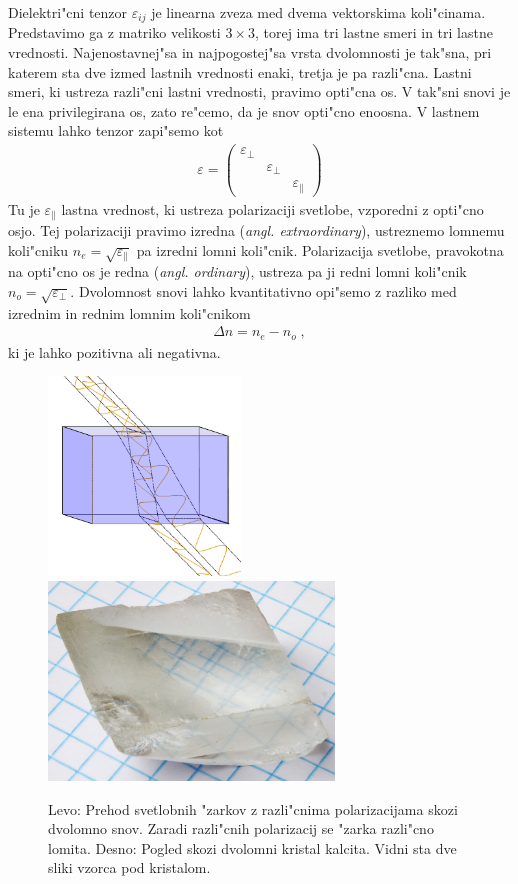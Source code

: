 \documentclass[12pt,twoside,openright,final,a4paper]{report}
\newcommand{\angl}[1]{(\textit{angl. #1})}
\begin{document}
Dielektri"cni tenzor $\varepsilon_{ij}$ je linearna zveza med dvema vektorskima koli"cinama. 
Predstavimo ga z matriko velikosti $3\times 3$, torej ima tri lastne smeri in tri lastne vrednosti.
Najenostavnej"sa in najpogostej"sa vrsta dvolomnosti je tak"sna, pri katerem sta dve izmed lastnih vrednosti enaki, tretja je pa razli"cna. 
Lastni smeri, ki ustreza razli"cni lastni vrednosti, pravimo opti"cna os. 
V tak"sni snovi je le ena privilegirana os, zato re"cemo, da je snov opti"cno enoosna. 
V lastnem sistemu lahko tenzor zapi"semo kot
\begin{align}
  \varepsilon = \begin{pmatrix}\varepsilon_\perp & & \\ & \varepsilon_\perp & \\ & & \varepsilon_\parallel \end{pmatrix}
\end{align}
Tu je $\varepsilon_\parallel$ lastna vrednost, ki ustreza polarizaciji svetlobe, vzporedni z opti"cno osjo. 
Tej polarizaciji pravimo izredna \angl{extraordinary}, ustreznemo lomnemu koli"cniku $n_e = \sqrt{\varepsilon_\parallel}$ pa izredni lomni koli"cnik. 
Polarizacija svetlobe, pravokotna na opti"cno os je redna \angl{ordinary}, ustreza pa ji redni lomni koli"cnik $n_o = \sqrt{\varepsilon_\perp}$. 
Dvolomnost snovi lahko kvantitativno opi"semo z razliko med izrednim in rednim lomnim koli"cnikom
\begin{align}
  \Delta n = n_e - n_o\;,
\end{align}
ki je lahko pozitivna ali negativna. 

\begin{figure}[h]
  \centering
  \includegraphics[height=150pt]{Rays_passing_through_birefringent_material}
  \includegraphics[height=150pt]{Crystal_on_graph_paper}
  \caption{Levo: Prehod svetlobnih "zarkov z razli"cnima polarizacijama skozi dvolomno snov. 
Zaradi razli"cnih polarizacij se "zarka razli"cno lomita. Desno: Pogled skozi dvolomni kristal kalcita. Vidni sta dve sliki vzorca pod kristalom. \cite{wiki:birefringence}}
  \label{fig:dvolomnost}
\end{figure}
\end{document}
